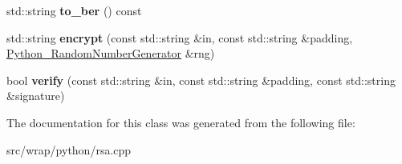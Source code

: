 \begin{DoxyCompactItemize}
\item 
\hypertarget{classPy__RSA__PublicKey_aabd61cc82475650e366ec257cf3f32d1}{std\-::string {\bfseries to\-\_\-ber} () const }\label{classPy__RSA__PublicKey_aabd61cc82475650e366ec257cf3f32d1}

\item 
\hypertarget{classPy__RSA__PublicKey_af99713b992b551ed64aadd70d21a4ff5}{std\-::string {\bfseries encrypt} (const std\-::string \&in, const std\-::string \&padding, \hyperlink{classPython__RandomNumberGenerator}{Python\-\_\-\-Random\-Number\-Generator} \&rng)}\label{classPy__RSA__PublicKey_af99713b992b551ed64aadd70d21a4ff5}

\item 
\hypertarget{classPy__RSA__PublicKey_a705a20b257aaf508e9f05d102b4dcaa8}{bool {\bfseries verify} (const std\-::string \&in, const std\-::string \&padding, const std\-::string \&signature)}\label{classPy__RSA__PublicKey_a705a20b257aaf508e9f05d102b4dcaa8}

\end{DoxyCompactItemize}


The documentation for this class was generated from the following file\-:\begin{DoxyCompactItemize}
\item 
src/wrap/python/rsa.\-cpp\end{DoxyCompactItemize}
